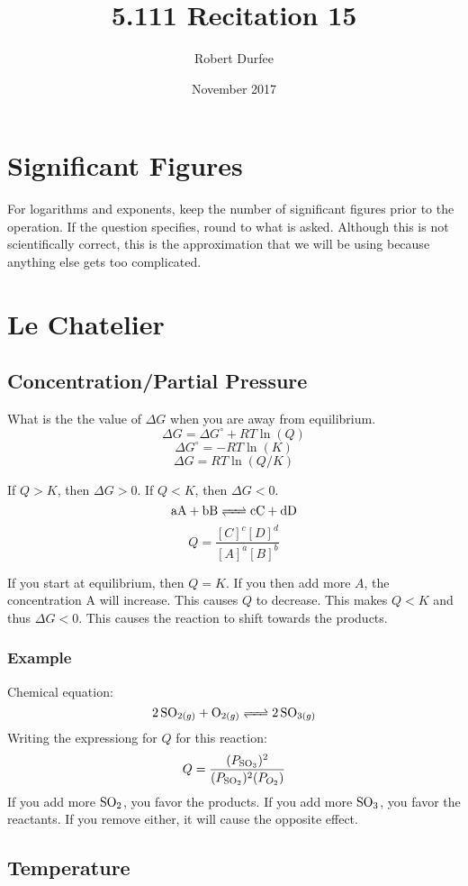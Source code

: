 \documentclass{article}
\title{5.111 Recitation 15}
\author{Robert Durfee}
\date{November 2017}
\begin{document}
\maketitle

\section{Significant Figures}

For logarithms and exponents, keep the number of significant figures prior to
the operation. If the question specifies, round to what is asked. Although this
is not scientifically correct, this is the approximation that we will be using
because anything else gets too complicated.

\section{Le Chatelier}

\subsection{Concentration/Partial Pressure}

What is the the value of $\Delta G$ when you are away from equilibrium.
$$\Delta G=\Delta G^{\circ}+RT\ln(Q)$$
$$\Delta G^{\circ}= -RT\ln(K)$$
$$\Delta G = RT\ln(Q/K)$$

If $Q>K$, then $\Delta G>0$. If $Q<K$, then $\Delta G <0$.
$$\ce{aA + bB <=> cC + dD}$$
$$Q=\frac{[C]^c[D]^d}{[A]^a[B]^b}$$

If you start at equilibrium, then $Q=K$. If you then add more $A$, the
concentration A will increase. This causes $Q$ to decrease. This makes $Q<K$ and
thus $\Delta G<0$. This causes the reaction to shift towards the products.

\subsubsection*{Example}
Chemical equation:
$$\ce{2SO_{2(g)} + O_{2(g)} <=> 2SO_{3(g)}}$$
Writing the expressiong for $Q$ for this reaction:
$$Q=\frac{(P_{\ce{SO_3}})^2}{(P_{\ce{SO_2}})^{2}(P_{O_2})}$$
If you add more $\ce{SO_{2}}$, you favor the products. If you add more
$\ce{SO_3}$, you favor the reactants. If you remove either, it will cause the
opposite effect.

\subsection{Temperature}
\end{document}
